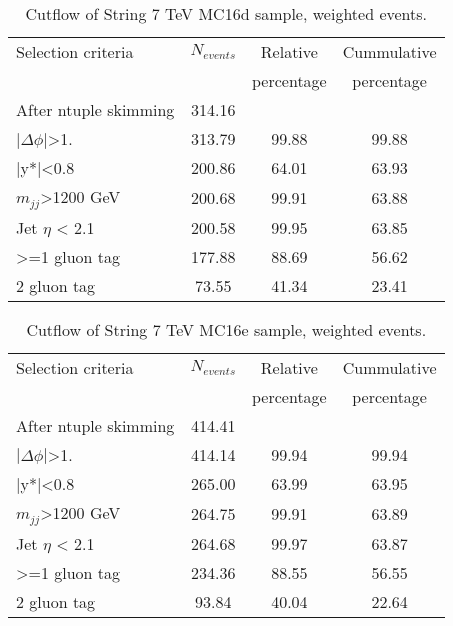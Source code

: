 \begin{table}[ht]
\begin{center}
\begin{tabular}{|l|c|c|c|}
\hline
Selection criteria & $N_{events}$ & Relative & Cummulative \\
 & & percentage & percentage \\
\hline
After ntuple skimming & 314.16 &  &  \\
$|\Delta\phi|$>1. & 313.79 & 99.88 & 99.88 \\
|y*|<0.8 & 200.86 & 64.01 & 63.93 \\
$m_{jj}$>1200 GeV & 200.68 & 99.91 & 63.88 \\
Jet $\eta$ < 2.1 & 200.58 & 99.95 & 63.85 \\
>=1 gluon tag & 177.88 & 88.69 & 56.62 \\
2 gluon tag & 73.55 & 41.34 & 23.41 \\
\hline
\end{tabular}
\end{center}
\caption{Cutflow of String 7 TeV MC16d sample, weighted events.}
\end{table}

\begin{table}[ht]
\begin{center}
\begin{tabular}{|l|c|c|c|}
\hline
Selection criteria & $N_{events}$ & Relative & Cummulative \\
 & & percentage & percentage \\
\hline
After ntuple skimming & 414.41 &  &  \\
$|\Delta\phi|$>1. & 414.14 & 99.94 & 99.94 \\
|y*|<0.8 & 265.00 & 63.99 & 63.95 \\
$m_{jj}$>1200 GeV & 264.75 & 99.91 & 63.89 \\
Jet $\eta$ < 2.1 & 264.68 & 99.97 & 63.87 \\
>=1 gluon tag & 234.36 & 88.55 & 56.55 \\
2 gluon tag & 93.84 & 40.04 & 22.64 \\
\hline
\end{tabular}
\end{center}
\caption{Cutflow of String 7 TeV MC16e sample, weighted events.}
\end{table}

